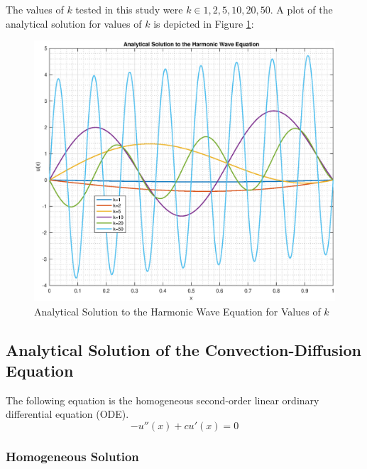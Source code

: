 \documentclass[10pt]{article}		%
\numberwithin{equation}{section}
\begin{document}
The values of $k$ tested in this study were $k \in {1, 2, 5, 10, 20, 50}$. A plot of the analytical solution for values of $k$ is depicted in Figure \ref{fig:analytical_harmonic}:
\begin{figure}[H]
	\begin{center}
		\includegraphics[width = 0.9\linewidth]{analytical_solution_harmonic_wave}
		\caption{Analytical Solution to the Harmonic Wave Equation for Values of $k$}
		\label{fig:analytical_harmonic}
	\end{center}
\end{figure}

\newpage

\subsection{Analytical Solution of the Convection-Diffusion Equation}

The following equation is the homogeneous second-order linear ordinary differential equation (ODE).
\begin{equation}
- u''(x)+cu'(x)=0
\end{equation}

\subsubsection{Homogeneous Solution}
\end{document}
